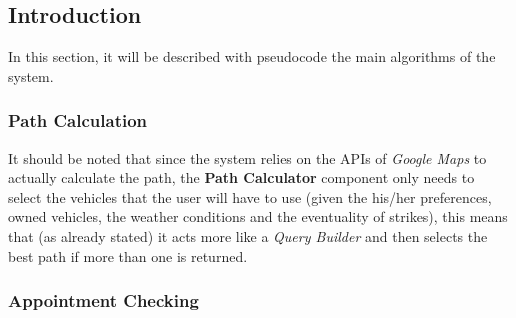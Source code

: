 \subsection{Introduction}
In this section, it will be described with pseudocode the main algorithms of the system.

\subsubsection{Path Calculation}
It should be noted that since the system relies on the APIs of \emph{Google Maps} to actually calculate the path, the \textbf{Path Calculator} component only needs to select the vehicles that the user will have to use (given the his/her preferences, owned vehicles, the weather conditions and the eventuality of strikes), this means that (as already stated) it acts more like a \emph{Query Builder} and then selects the best path if more than one is returned.


\subsubsection{Appointment Checking}
